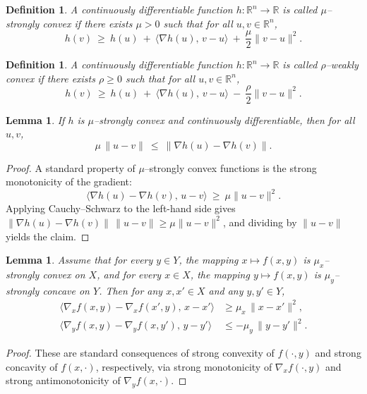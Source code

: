 \documentclass{article}
\newtheorem{lemma}[theorem]{Lemma}
\newtheorem{definition}[theorem]{Definition}
\newcommand{\1}{\mathbf{1}}
\begin{document}
\begin{definition}\label{def:SC}
A continuously differentiable function $h:\mathbb{R}^n\to\mathbb{R}$ is called $\mu$--strongly convex
if there exists $\mu>0$ such that for all $u,v\in\mathbb{R}^n$,
\[
h(v)\ \ge\ h(u)\ +\ \langle \nabla h(u),\,v-u\rangle\ +\ \frac{\mu}{2}\|v-u\|^{2}.
\]
\end{definition}

\begin{definition}\label{def:weak-convex}
A continuously differentiable function $h:\mathbb{R}^n\to\mathbb{R}$ is called $\rho$--weakly convex
if there exists $\rho\ge 0$ such that for all $u,v\in\mathbb{R}^n$,
\[
h(v)\ \ge\ h(u)\ +\ \langle \nabla h(u),\,v-u\rangle\ -\ \frac{\rho}{2}\|v-u\|^{2}.
\]
\end{definition}



\begin{lemma}\label{lem:coercive}
If $h$ is $\mu$--strongly convex and continuously differentiable, then for all $u,v$,
\[
\mu\,\|u-v\|\ \le\ \|\nabla h(u)-\nabla h(v)\|.
\]
\end{lemma}

\begin{proof}
A standard property of $\mu$--strongly convex functions is the strong monotonicity of the gradient:
\[
\langle \nabla h(u)-\nabla h(v),\,u-v\rangle\ \ge\ \mu\|u-v\|^{2}.
\]
Applying Cauchy--Schwarz to the left-hand side gives
$\|\nabla h(u)-\nabla h(v)\|\,\|u-v\|\ge \mu\|u-v\|^2$, and dividing by $\|u-v\|$ yields the claim.
\end{proof}

\begin{lemma}\label{lem:one-sided}
Assume that for every $y\in Y$, the mapping $x\mapsto f(x,y)$ is $\mu_x$--strongly convex on $X$,
and for every $x\in X$, the mapping $y\mapsto f(x,y)$ is $\mu_y$--strongly concave on $Y$.
Then for any $x,x'\in X$ and any $y,y'\in Y$,
\begin{align}
\big\langle \nabla_x f(x,y)-\nabla_x f(x',y),\,x-x'\big\rangle
&\ge \mu_x\,\|x-x'\|^2,
\label{eq:scx}\\
\big\langle \nabla_y f(x,y)-\nabla_y f(x,y'),\,y-y'\big\rangle
&\le -\mu_y\,\|y-y'\|^2.
\label{eq:sccy}
\end{align}
\end{lemma}


\begin{proof}
These are standard consequences of strong convexity of $f(\cdot,y)$ and strong concavity of $f(x,\cdot)$,
respectively, via strong monotonicity of $\nabla_x f(\cdot,y)$ and strong antimonotonicity of $\nabla_y f(x,\cdot)$.
\end{proof}
\end{document}
